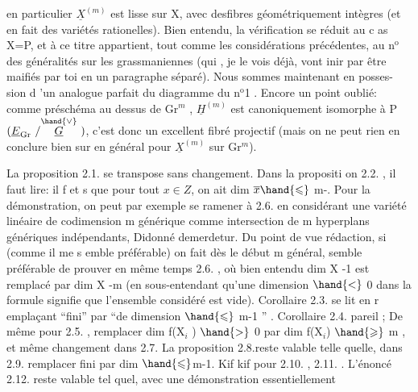 
en particulier $\underline{X}^{(m)}$ est lisse sur X, avec des\hand{/}fibres géométriquement
intègres (et en fait des variétés rationelles). Bien entendu, la
vérification se réduit au c as X=P, et à ce titre appartient, tout
comme les considérations précédentes, au n$^{\text{o}}$ des généralités sur les
grassmaniennes (qui , je le vois déjà, vont inir par être maifiés
par toi en un paragraphe séparé). Nous sommes maintenant en posses-%
sion d 'un analogue parfait du diagramme du n$^{\text{o}}$1 . Encore un point
oublié: comme préschéma au dessus de Gr$^{m}$ , $\underline{H}^{(m)}$ est canoniquement
isomorphe à P$(\underline{E}_{\mathrm{Gr}}\ /\overset{\hand{\vee}}{\underline{G}}\ )$, c'est donc un excellent fibré projectif
(mais on ne peut rien en conclure bien sur en général pour $\underline{X}^{(m)}$ sur
Gr$^{m}$).

La proposition 2.1. se transpose sans changement. Dans la
propositi on 2.2. , il faut lire: il f et s que pour tout $x \in Z$, on
ait  dim $\overline{x} \hand{\leqslant}$ m-. Pour la démonstration, on peut par exemple
se ramener à 2.6. en considérant une  variété linéaire de
codimension m générique comme intersection de m hyperplans génériques
indépendants, Didonné demerdetur. Du point de vue rédaction, si
(comme il me s emble préférable) on fait dès le début m général, 
semble préférable de prouver en même temps 2.6. , où bien entendu
dim X -1 est remplacé par dim X -m (en sous-entendant qu'une dimension
$\hand{<}$ 0 dans la formule signifie que l'ensemble considéré est vide).
Corollaire 2.3. se lit en r emplaçant ``fini'' par ``de dimension $\hand{\leqslant}$ 
m-1 '' . Corollaire 2.4. pareil ; De même pour 2.5. , remplacer
dim f(X$_{i}$ ) $\hand{>}$ 0 par dim f(X$_{i}$) $\hand{\geqslant}$ m , et même changement dans 2.7.
La proposition 2.8.reste valable telle quelle, dans 2.9. remplacer
fini par dim $\hand{\leqslant}$m-1. Kif kif pour 2.10. , 2.11. . L'énoncé
2.12. reste valable tel quel, avec une démonstration essentiellement

